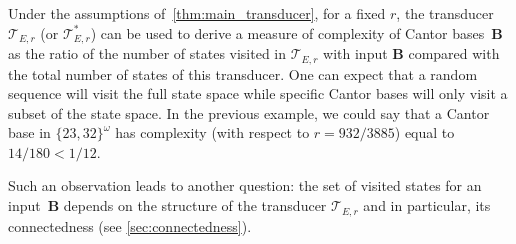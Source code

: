 \documentclass[12pt,reqno]{amsart}
\newcommand{\B}{{\mathbf{B}}}
\begin{document}
\begin{remark}\label{rem:complexity}
    Under the assumptions of~\cref{thm:main_transducer}, for a fixed $r$, the transducer $\mathcal{T}_{E,r}$ (or $\mathcal{T}^*_{E,r}$) can be used to derive a measure of complexity of Cantor bases~$\B$ as the ratio of the number of states visited in $\mathcal{T}_{E,r}$ with input $\B$ compared with the total number of states of this transducer. One can expect that a random sequence will visit the full state space while specific Cantor bases will only visit a subset of the state space. In the previous example, we could say that a Cantor base in $\{23,32\}^\omega$ has complexity (with respect to $r=932/3885$) equal to $14/180<1/12$. 
    
    Such an observation leads to another question: the set of visited states for an input~$\B$ depends on the structure of the transducer $\mathcal{T}_{E,r}$ and in particular, its connectedness (see \cref{sec:connectedness}).
\end{remark}
    
\end{document}
